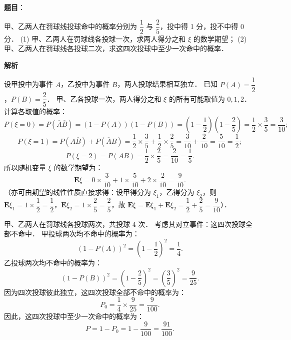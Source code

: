 \begin{answer}

\textbf{题目}：

甲、乙两人在罚球线投球命中的概率分别为 $\dfrac{1}{2}$ 与 $\dfrac{2}{5}$，投中得 1 分，投不中得 0 分．
(1) 甲、乙两人在罚球线各投球一次，求两人得分之和 $\xi$ 的数学期望；
(2) 甲、乙两人在罚球线各投球二次，求这四次投球中至少一次命中的概率．

\textbf{解析}


设甲投中为事件 $A$，乙投中为事件 $B$，两人投球结果相互独立．
已知 $P(A) = \dfrac{1}{2}$，$P(B) = \dfrac{2}{5}$．
甲、乙各投球一次，两人得分之和 $\xi$ 的所有可能取值为 $0, 1, 2$．
计算各取值的概率：
\nopagebreak[4]
\[
P(\xi = 0) = P(\overline{A}\overline{B}) = (1 - P(A))(1 - P(B)) = \left(1 - \frac{1}{2}\right)\left(1 - \frac{2}{5}\right) = \frac{1}{2} \times \frac{3}{5} = \frac{3}{10};
\]
\nopagebreak[4]
\[
P(\xi = 1) = P(A\overline{B}) + P(\overline{A}B) = \frac{1}{2} \times \frac{3}{5} + \frac{1}{2} \times \frac{2}{5} = \frac{3}{10} + \frac{2}{10} = \frac{5}{10} = \frac{1}{2};
\]
\nopagebreak[4]
\[
P(\xi = 2) = P(AB) = \frac{1}{2} \times \frac{2}{5} = \frac{2}{10} = \frac{1}{5}.
\]
所以随机变量 $\xi$ 的数学期望为：
\nopagebreak[4]
\[
\mathbf{E}\xi = 0 \times \frac{3}{10} + 1 \times \frac{5}{10} + 2 \times \frac{2}{10} = \frac{9}{10}.
\]
（亦可由期望的线性性质直接求得：设甲得分为 $\xi_1$，乙得分为 $\xi_2$，则 $\mathbf{E}\xi_1 = 1 \times \dfrac{1}{2} = \dfrac{1}{2}$，$\mathbf{E}\xi_2 = 1 \times \dfrac{2}{5} = \dfrac{2}{5}$，故 $\mathbf{E}\xi = \mathbf{E}\xi_1 + \mathbf{E}\xi_2 = \dfrac{1}{2} + \dfrac{2}{5} = \dfrac{9}{10}$）．


甲、乙两人在罚球线各投球两次，共投球 4 次．
考虑其对立事件：这四次投球全部不命中．
甲投球两次均不命中的概率为：
\nopagebreak[4]
\[
(1 - P(A))^2 = \left(1 - \frac{1}{2}\right)^2 = \frac{1}{4}.
\]
乙投球两次均不命中的概率为：
\nopagebreak[4]
\[
(1 - P(B))^2 = \left(1 - \frac{2}{5}\right)^2 = \left(\frac{3}{5}\right)^2 = \frac{9}{25}.
\]
因为四次投球彼此独立，这四次投球全部不命中的概率为：
\nopagebreak[4]
\[
P_0 = \frac{1}{4} \times \frac{9}{25} = \frac{9}{100}.
\]
因此，这四次投球中至少一次命中的概率为：
\nopagebreak[4]
\[
P = 1 - P_0 = 1 - \frac{9}{100} = \frac{91}{100}.
\]



\end{answer}
